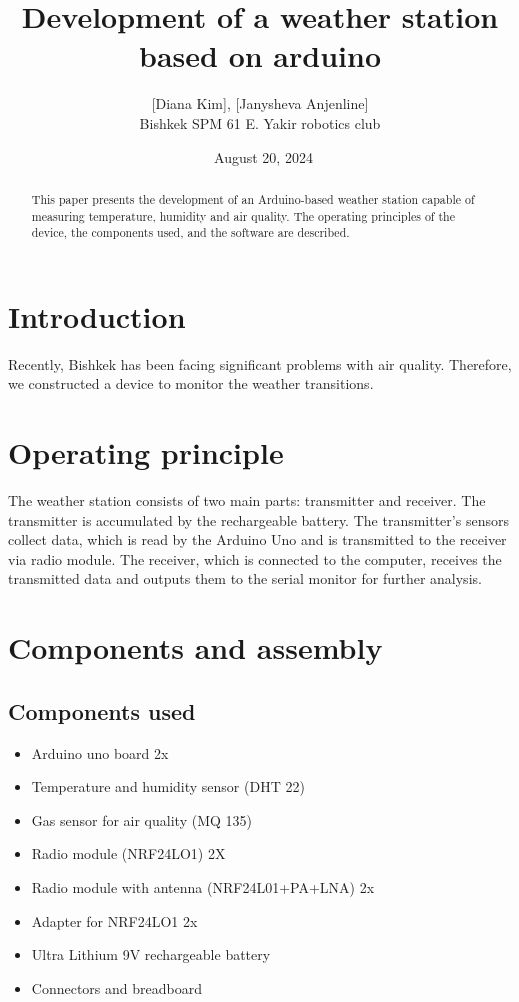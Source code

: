 \documentclass[a4paper,12pt]{article}
\title{Development of a weather station based on arduino}
\author{[Diana Kim], [Janysheva Anjenline] \\ Bishkek SPM 61 E. Yakir robotics club}
\date{\ August 20, 2024}
\begin{document}
\maketitle

\begin{abstract}
This paper presents the development of an Arduino-based weather station capable of measuring temperature, humidity and air quality. The operating principles of the device, the components used, and the software are described.
\end{abstract}

\section{Introduction}
Recently, Bishkek has been facing significant problems with air quality. Therefore, we constructed a device to monitor the weather transitions.        
\section{Operating principle}
The weather station consists of two main parts: transmitter and receiver. The transmitter is accumulated by the rechargeable battery. The transmitter's sensors collect data, which is read by the Arduino Uno and is transmitted to the receiver via radio module. The receiver, which is connected to the computer, receives the transmitted data and outputs them to the serial monitor for further analysis.  
\section{Components and assembly}
\subsection{Components used}
\begin{itemize}
    \item Arduino uno board 2x
    \item Temperature and humidity sensor (DHT 22)
    \item Gas sensor for air quality (MQ 135)
    \item Radio module (NRF24LO1) 2X
    \item Radio module with antenna (NRF24L01+PA+LNA) 2x
    \item Adapter for NRF24LO1 2x
    \item Ultra Lithium 9V rechargeable battery
    \item Connectors and breadboard
\end{itemize}
\end{document}
